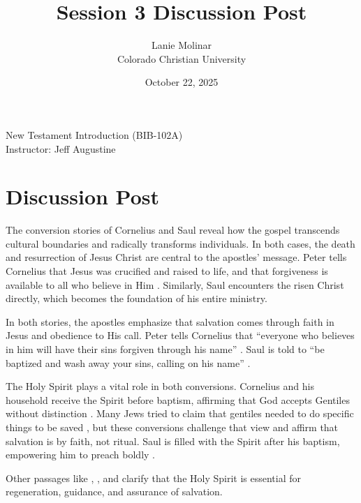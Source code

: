 \documentclass[12pt,letterpaper]{article}
\title{Session 3 Discussion Post}
\author{Lanie Molinar\\Colorado Christian University}
\date{October 22, 2025}
\begin{document}
\begin{titlepage}
\maketitle
\thispagestyle{fancy}

\begin{center}
New Testament Introduction (BIB-102A)\\
Instructor: Jeff Augustine
\end{center}
\end{titlepage}

\section{Discussion Post}

The conversion stories of Cornelius \parencite[Acts 10–11]{Tyndale1996} and Saul \parencite[Acts 9; 22; 26]{Tyndale1996} reveal how the gospel transcends cultural boundaries and radically transforms individuals. In both cases, the death and resurrection of Jesus Christ are central to the apostles’ message. Peter tells Cornelius that Jesus was crucified and raised to life, and that forgiveness is available to all who believe in Him \parencite[Acts 10:39–43]{Tyndale1996}. Similarly, Saul encounters the risen Christ directly, which becomes the foundation of his entire ministry.

In both stories, the apostles emphasize that salvation comes through faith in Jesus and obedience to His call. Peter tells Cornelius that “everyone who believes in him will have their sins forgiven through his name” \parencite[Acts 10:43]{Tyndale1996}. Saul is told to “be baptized and wash away your sins, calling on his name” \parencite[Acts 22:16]{Tyndale1996}.

The Holy Spirit plays a vital role in both conversions. Cornelius and his household receive the Spirit before baptism, affirming that God accepts Gentiles without distinction \parencite[Acts 10:44–48]{Tyndale1996}. Many Jews tried to claim that gentiles needed to do specific things to be saved \parencite[chapter 15]{elwellEncounteringNewTestament2022}, but these conversions challenge that view and affirm that salvation is by faith, not ritual. Saul is filled with the Spirit after his baptism, empowering him to preach boldly \parencite[Acts 9:17–20]{Tyndale1996}.

Other passages like \textcite[John 3:5]{Tyndale1996}, \textcite[Romans 8:9–11]{Tyndale1996}, and \textcite[Titus 3:5–6]{Tyndale1996} clarify that the Holy Spirit is essential for regeneration, guidance, and assurance of salvation.
\end{document}
